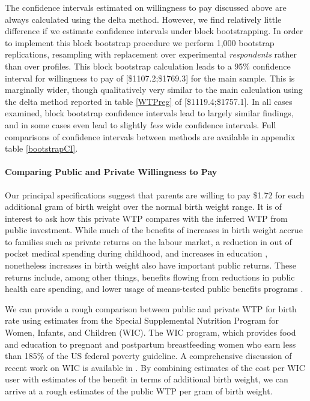 \documentclass[a4paper, 11pt]{article}
\begin{document}
\begin{spacing}{1.4}
The confidence intervals estimated on willingness to pay discussed
above are always calculated using the delta method.  However, we find
relatively little difference if we estimate confidence intervals under
block bootstrapping.  In order to implement this block bootstrap
procedure we perform 1,000 bootstrap replications, resampling with
replacement over experimental \emph{respondents} rather than over
profiles.  This block bootstrap calculation leads to a 95\% confidence
interval for willingness to pay of [\$1107.2;\$1769.3] for the main
sample.  This is marginally wider, though qualitatively very similar to
the main calculation using the delta method reported in table \ref{WTPreg}
of [\$1119.4;\$1757.1].  In all cases examined, block bootstrap confidence
intervals lead to largely similar findings, and in some cases even lead to
slightly \emph{less} wide confidence intervals. Full comparisons of
confidence intervals between methods are available in appendix table
 \ref{bootstrapCI}.


\paragraph{Comparing Public and Private Willingness to Pay}
Our principal specifications suggest that parents are willing to pay
\$1.72 for each additional gram of birth weight over the normal birth
weight range.  It is of interest to ask how this private WTP compares
with the inferred WTP from public investment.  While much of the benefits
of increases in birth weight accrue to families such as private returns
on the labour market, a reduction in out of pocket medical spending during
childhood, and increases in education \citep{BehrmanRosenzweig2004,
  Oreopoulosetal2008}, nonetheless increases in birth weight also have
important public returns.  These returns include, among other things,
benefits flowing from reductions in public health care spending,
and lower usage of means-tested public benefits programs
\citep{Almondetal2005,Bharadwajetal2015}.

We can provide a rough comparison between public and private WTP for
birth rate using estimates from the Special Supplemental Nutrition
Program for Women, Infants, and Children (WIC).  The WIC program,
which provides food and education to pregnant and postpartum
breastfeeding women who earn less than 185\% of the US federal
poverty guideline.  A comprehensive discussion of recent work on
WIC is available in \citet{BitlerKaroly2015}.  By combining estimates
of the cost per WIC user with estimates of the benefit in terms of
additional birth weight, we can arrive at a rough estimates of the
public WTP per gram of birth weight.


\end{spacing}
\end{document}
